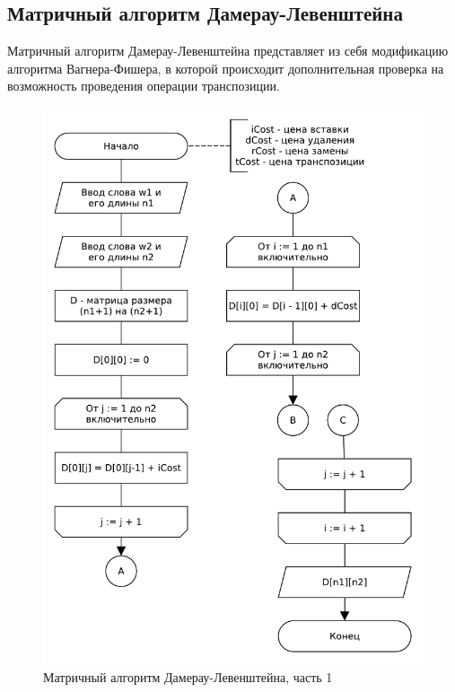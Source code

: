 \subsection{Матричный алгоритм Дамерау-Левенштейна}
Матричный алгоритм Дамерау-Левенштейна представляет из себя модификацию алгоритма Вагнера-Фишера, в которой происходит дополнительная проверка на возможность проведения операции транспозиции.
\begin{figure}[H]
    \centering
    \includegraphics[scale=0.8]{pdf/damerau-levenshteain-part1.pdf}
    \caption{Матричный алгоритм Дамерау-Левенштейна, часть 1}
\end{figure}

